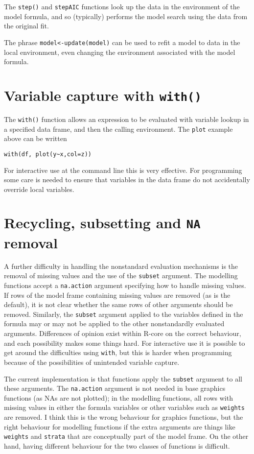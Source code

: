 \documentclass[11pt]{article}
\begin{document}
The \texttt{step()} and \texttt{stepAIC} functions look up the data in
the environment of the model formula, and so (typically) performs the
model search using the data from the original fit.


The phrase \texttt{model<-update(model)} can be used to refit a model
to data in the local environment, even changing the environment associated with the model formula.

\section{Variable capture with \texttt{with()}}
The \verb=with()= function allows an expression to be evaluated with variable lookup in a specified data frame,  and then the calling environment. The \texttt{plot} example above can be written
\begin{verbatim}
with(df, plot(y~x,col=z))
\end{verbatim}
For interactive use at the command line this is very effective.  For programming some care is needed to ensure that variables in the data frame do not accidentally override local variables.

\section{Recycling, subsetting and \texttt{NA} removal}
A further difficulty in handling the nonstandard evaluation mechanisms is the removal of missing values and the use of the \texttt{subset} argument.  The modelling functions accept a \texttt{na.action} argument specifying how to handle missing values. If rows of the model frame containing missing values are removed (as is the default), it is not clear whether the same rows of other arguments should be removed.  Similarly, the \texttt{subset} argument applied to the variables defined in the formula may or may not be applied to the other nonstandardly evaluated arguments.  Differences of opinion exist within R-core on the correct behaviour, and each possibility makes some things hard.   For interactive use it is possible to get around the difficulties using \texttt{with}, but this is harder when programming because of the possibilities of unintended variable capture.

The current implementation is that functions apply the \texttt{subset} argument to all these arguments.  The \texttt{na.action} argument is not needed in base graphics functions (as NAs are not plotted); in the modelling functions, all rows with missing values in either the formula variables or other variables such as \texttt{weights} are removed.   I think this is the wrong behaviour for graphics functions, but the right behaviour for modelling functions if the extra arguments are things like \texttt{weights} and \texttt{strata} that are conceptually part of the model frame.  On the other hand, having different behaviour for the two classes of functions is difficult.
\end{document}
